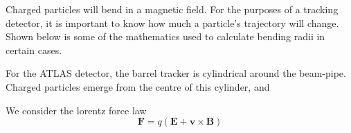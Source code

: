 \documentclass[a4paper, 12pt]{article}
\begin{document}
Charged particles will bend in a magnetic field. 
For the purposes of a tracking detector, it is important to know how much a particle's trajectory will change. 
Shown below is some of the mathematics used to calculate bending radii in certain cases. 

For the ATLAS detector, the barrel tracker is cylindrical around the beam-pipe. 
Charged particles emerge from the centre of this cylinder, and 

We consider the lorentz force law
\begin{equation}
  \mathbf{F} = q( \mathbf{E} + \mathbf{v} \times \mathbf{B})
\end{equation}
\end{document}
